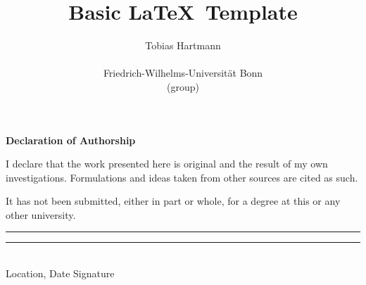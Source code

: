 \pagestyle{headings}  %
\title{Basic \LaTeX \, Template}
\author{Tobias Hartmann\\ \begin{minipage}{8cm}\centering \small Friedrich-Wilhelms-Universität Bonn\\ \small (group)\end{minipage}}

\vspace{4cm}

\cleardoublepage
\thispagestyle{empty}
{\noindent%
    \huge{\textbf{\textsf{Declaration of Authorship}}}
}
\vspace{2cm}
\begin{flushleft}
    \noindent%
    I declare that the work presented here is original and the result of my own investigations.
    Formulations and ideas taken from other sources are cited as such.

    It has not been submitted, either in part or whole, for a degree at this or any other university.
\end{flushleft}

\vfill
\noindent%
\rule[1em]{8em}{0.5pt}  \hfill \rule[1em]{8em}{0.5pt}\\ %
Location, Date \hfill Signature\\


\cleardoublepage
